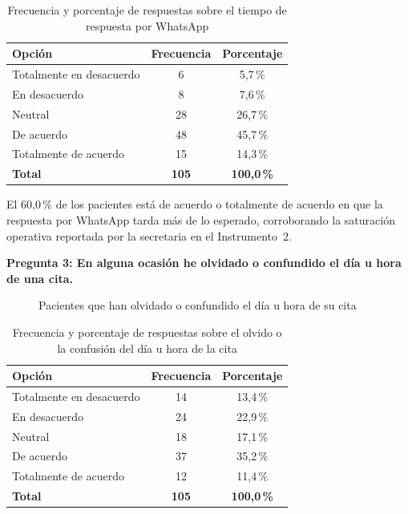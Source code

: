 \begin{table}[H]
\centering
\caption{Frecuencia y porcentaje de respuestas sobre el tiempo de respuesta por WhatsApp}
\label{tab:p2_frecuencia}
\fontsize{10}{12}\selectfont
\renewcommand{\arraystretch}{1.2}
\begin{tabular}{|l|c|c|}
\hline
\textbf{Opción} & \textbf{Frecuencia} & \textbf{Porcentaje} \\ \hline
Totalmente en desacuerdo & 6 & 5{,}7\,\% \\ \hline
En desacuerdo & 8 & 7{,}6\,\% \\ \hline
Neutral & 28 & 26{,}7\,\% \\ \hline
De acuerdo & 48 & 45{,}7\,\% \\ \hline
Totalmente de acuerdo & 15 & 14{,}3\,\% \\ \hline
\textbf{Total} & \textbf{105} & \textbf{100{,}0\,\%} \\ \hline
\end{tabular}
\end{table}

\smallskip
El 60{,}0\,\% de los pacientes está de acuerdo o totalmente de acuerdo en que la respuesta
por WhatsApp tarda más de lo esperado, corroborando la saturación operativa reportada por
la secretaria en el Instrumento~2.

\medskip
\textbf{Pregunta 3: En alguna ocasión he olvidado o confundido el día u hora de una cita.}

\begin{figure}[H]
\centering
{}
\caption{Pacientes que han olvidado o confundido el día u hora de su cita}
\label{fig:p3_torta}
\end{figure}

\begin{table}[H]
\centering
\caption{Frecuencia y porcentaje de respuestas sobre el olvido o la confusión del día u hora de la cita}
\label{tab:p3_frecuencia}
\fontsize{10}{12}\selectfont
\renewcommand{\arraystretch}{1.2}
\begin{tabular}{|l|c|c|}
\hline
\textbf{Opción} & \textbf{Frecuencia} & \textbf{Porcentaje} \\ \hline
Totalmente en desacuerdo & 14 & 13{,}4\,\% \\ \hline
En desacuerdo & 24 & 22{,}9\,\% \\ \hline
Neutral & 18 & 17{,}1\,\% \\ \hline
De acuerdo & 37 & 35{,}2\,\% \\ \hline
Totalmente de acuerdo & 12 & 11{,}4\,\% \\ \hline
\textbf{Total} & \textbf{105} & \textbf{100{,}0\,\%} \\ \hline
\end{tabular}
\end{table}

